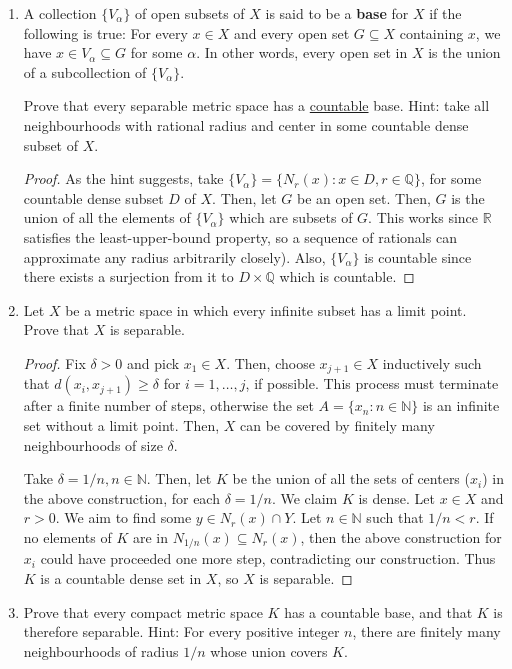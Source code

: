 \documentclass{scrbook}
\newcommand{\N}{\mathbb{N}}
\newcommand{\Q}{\mathbb{Q}}
\newcommand{\R}{\mathbb{R}}
\renewcommand{\underline}{\ul}
\begin{document}
\begin{enumerate}
\item %
A collection $\{V_\alpha\}$ of open subsets of $X$ is said to be a \textbf{base} for $X$ if the following is true: For every $x \in X$ and every open set $G \subseteq X$ containing $x$, we have $x \in V_\alpha \subseteq G$ for some $\alpha$. In other words, every open set in $X$ is the union of a subcollection of $\{V_\alpha\}$.

Prove that every separable metric space has a \underline{countable} base. Hint: take all neighbourhoods with rational radius and center in some countable dense subset of $X$.

\begin{proof}
As the hint suggests, take $\{V_\alpha\} = \{N_r(x): x \in D, r \in \Q\}$, for some countable dense subset $D$ of $X$. Then, let $G$ be an open set. Then, $G$ is the union of all the elements of $\{V_\alpha\}$ which are subsets of $G$. This works since $\R$ satisfies the least-upper-bound property, so a sequence of rationals can approximate any radius arbitrarily closely). Also, $\{V_\alpha\}$ is countable since there exists a surjection from it to $D \times \Q$ which is countable.
\end{proof}

\item %
Let $X$ be a metric space in which every infinite subset has a limit point. Prove that $X$ is separable.

\begin{proof}
Fix $\delta > 0$ and pick $x_1 \in X$. Then, choose $x_{j+1} \in X$ inductively such that $d(x_i, x_{j+1}) \ge \delta$ for $i = 1, \dotsc, j$, if possible. This process must terminate after a finite number of steps, otherwise the set $A = \{x_n : n \in \N\}$ is an infinite set without a limit point. Then, $X$ can be covered by finitely many neighbourhoods of size $\delta$. 

Take $\delta = 1/n, n \in \N$. Then, let $K$ be the union of all the sets of centers ($x_i$) in the above construction, for each $\delta = 1/n$. We claim $K$ is dense. Let $x \in X$ and $r > 0$. We aim to find some $y \in N_r(x) \cap Y$. Let $n \in \N$ such that $1/n < r$. If no elements of $K$ are in $N_{1/n}(x) \subseteq N_r(x)$, then the above construction for $x_i$ could have proceeded one more step, contradicting our construction. Thus $K$ is a countable dense set in $X$, so $X$ is separable.
\end{proof}

\item %
Prove that every compact metric space $K$ has a countable base, and that $K$ is therefore separable. Hint: For every positive integer $n$, there are finitely many neighbourhoods of radius $1/n$ whose union covers $K$.


\end{enumerate}
\end{document}
